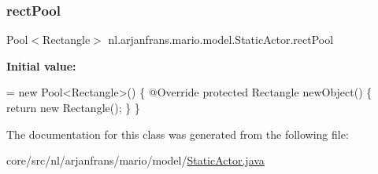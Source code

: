 \subsubsection{\texorpdfstring{rect\+Pool}{rectPool}}
{\footnotesize\ttfamily Pool$<$Rectangle$>$ nl.\+arjanfrans.\+mario.\+model.\+Static\+Actor.\+rect\+Pool\hspace{0.3cm}{\ttfamily [protected]}}

{\bfseries Initial value\+:}
\begin{DoxyCode}
= \textcolor{keyword}{new} Pool<Rectangle>()
    \{
        @Override
        \textcolor{keyword}{protected} Rectangle newObject() \{
            \textcolor{keywordflow}{return} \textcolor{keyword}{new} Rectangle();
        \}
    \}
\end{DoxyCode}


The documentation for this class was generated from the following file\+:\begin{DoxyCompactItemize}
\item 
core/src/nl/arjanfrans/mario/model/\hyperlink{StaticActor_8java}{Static\+Actor.\+java}\end{DoxyCompactItemize}
